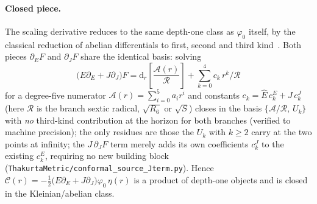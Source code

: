 \documentclass[12pt]{iopart}
\theoremstyle{plain}
\theoremstyle{definition}
\theoremstyle{remark}
\newcommand{\Ehat}{\hat E}
\newcommand{\dd}{\mathrm{d}}
\begin{document}
\paragraph{Closed piece.} The scaling derivative reduces to the same depth-one
class as $\varphi_0$ itself, by the classical reduction of abelian differentials to
first, second and third kind~\cite{BakerAbelian1897,GriffithsHarris1978}. Both pieces
$\partial_E F$ and $\partial_J F$ share the identical basis: solving
\begin{equation}
    \big(E\partial_E+J\partial_J\big)F=\dd_r\!\left[\frac{\mathcal{A}(r)}{\mathcal{R}}\right]
    +\sum_{k=0}^{4}c_k\,r^k/\mathcal{R}
    \label{eq:dEphi0}
\end{equation}
for a degree-five numerator $\mathcal{A}(r)=\sum_{i=0}^{5}a_i r^i$ and constants
$c_k=\Ehat\,c_k^{E}+J\,c_k^{J}$ (here $\mathcal{R}$ is the branch sextic radical,
$\sqrt{R_6}$ or $\sqrt{S}$) closes in the basis $\{\mathcal A/\mathcal R,\,U_k\}$ with
\emph{no} third-kind contribution at the horizon for both branches (verified to machine
precision); the only residues are those the $U_k$ with $k\ge2$ carry at the two points at
infinity; the
$J\,\partial_J F$ term merely adds its own coefficients $c_k^{J}$ to the existing
$c_k^{E}$, requiring no new building block
(\texttt{ThakurtaMetric/conformal\_source\_Jterm.py}). Hence
$\mathcal{C}(r)=-\tfrac12\big(E\partial_E+J\partial_J\big)\varphi_0\,\eta(r)$ is
a product of depth-one objects and is closed in the Kleinian/abelian class.
\end{document}
